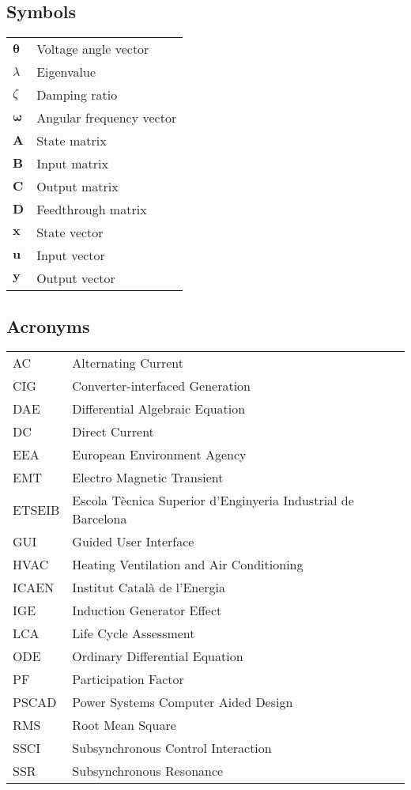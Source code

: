 \subsection*{Symbols}
\begin{tabular}{l@{\hspace{1.95cm}} l}
  $\bm{\theta}$ & Voltage angle vector \\
  $\lambda$ & Eigenvalue \\
  $\zeta$ & Damping ratio \\
  $\bm{\omega}$ & Angular frequency vector \\
  $\bm{A}$ & State matrix \\
  $\bm{B}$ & Input matrix \\
  $\bm{C}$ & Output matrix \\
  $\bm{D}$ & Feedthrough matrix \\
  $\bm{x}$ & State vector \\
  $\bm{u}$ & Input vector \\
  $\bm{y}$ & Output vector \\
  
  
 
\end{tabular}


\subsection*{Acronyms}
\begin{tabular}{l@{\hspace{1cm}} l}
  AC & Alternating Current \\
  CIG & Converter-interfaced Generation \\
  DAE & Differential Algebraic Equation\\
  DC & Direct Current \\
  EEA & European Environment Agency\\
  EMT & Electro Magnetic Transient\\
  ETSEIB & Escola Tècnica Superior d'Enginyeria Industrial de Barcelona\\
  GUI & Guided User Interface\\
  HVAC & Heating Ventilation and Air Conditioning \\
  ICAEN & Institut Català de l'Energia \\
  IGE & Induction Generator Effect\\
  LCA & Life Cycle Assessment \\
  ODE & Ordinary Differential Equation \\
  PF & Participation Factor\\
  PSCAD & Power Systems Computer Aided Design\\
  RMS & Root Mean Square\\
  SSCI & Subsynchronous Control Interaction\\
  SSR & Subsynchronous Resonance\\
  
\end{tabular}\par